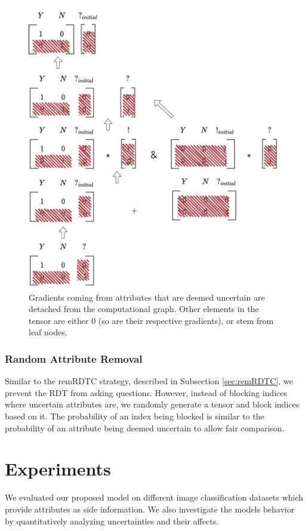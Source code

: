 \documentclass[a4paper,cleardoubleempty,BCOR1cm, 11pt]{report}
\begin{document}
\begin{figure}[t!]
\begin{minipage}{0.45\textwidth}
		\includegraphics[width=1\textwidth]{images/extended_vocab_backward.pdf}
		\caption{Gradients coming from attributes that are deemed uncertain are detached from the computational graph. Other elements in the tensor are either $0$ (so are their respective gradients), or stem from leaf nodes.}
		\label{fig:extended_vocab_backward}
	\end{minipage}
\end{figure}


\subsection{Random Attribute Removal}
Similar to the remRDTC strategy, described in Subsection \ref{sec:remRDTC}, we prevent the RDT from asking questions. However, instead of blocking indices where uncertain attributes are, we randomly generate a tensor and block indices based on it. The probability of an index being blocked is similar to the probability of an attribute being deemed uncertain to allow fair comparison.


\chapter{Experiments}
We evaluated our proposed model on different image classification datasets which provide attributes as side information. We also investigate the models behavior by quantitatively analyzing uncertainties and their affects.
\end{document}
